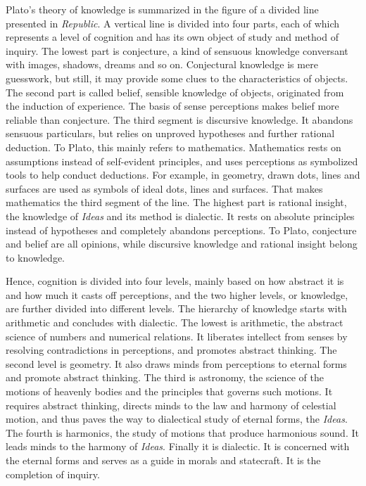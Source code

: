 \documentclass[11pt]{article}
\begin{document}
\begin{sloppypar}
Plato’s theory of knowledge is summarized in the figure of a divided line presented in \textit{Republic}. 
A vertical line is divided into four parts, each of which represents a level of cognition and has its own object of study and method of inquiry. 
The lowest part is conjecture, a kind of sensuous knowledge conversant with images, shadows, dreams and so on. 
Conjectural knowledge is mere guesswork, but still, it may provide some clues to the characteristics of objects. 
The second part is called belief, sensible knowledge of objects, originated from the induction of experience. 
The basis of sense perceptions makes belief more reliable than conjecture. 
The third segment is discursive knowledge. 
It abandons sensuous particulars, but relies on unproved hypotheses and further rational deduction. 
To Plato, this mainly refers to mathematics. 
Mathematics rests on assumptions instead of self-evident principles, and uses perceptions as symbolized tools to help conduct deductions. 
For example, in geometry, drawn dots, lines and surfaces are used as symbols of ideal dots, lines and surfaces. 
That makes mathematics the third segment of the line. 
The highest part is rational insight, the knowledge of \textit{Ideas} and its method is dialectic. 
It rests on absolute principles instead of hypotheses and completely abandons perceptions. 
To Plato, conjecture and belief are all opinions, while discursive knowledge and rational insight belong to knowledge.

\newline

Hence, cognition is divided into four levels, mainly based on how abstract it is and how much it casts off perceptions, and the two higher levels, or knowledge, are further divided into different levels. 
The hierarchy of knowledge starts with arithmetic and concludes with dialectic. 
The lowest is arithmetic, the abstract science of numbers and numerical relations. 
It liberates intellect from senses by resolving contradictions in perceptions, and promotes abstract thinking. 
The second level is geometry. 
It also draws minds from perceptions to eternal forms and promote abstract thinking. 
The third is astronomy, the science of the motions of heavenly bodies and the principles that governs such motions. 
It requires abstract thinking, directs minds to the law and harmony of celestial motion, and thus paves the way to dialectical study of eternal forms, the \textit{Ideas}. 
The fourth is harmonics, the study of motions that produce harmonious sound. 
It leads minds to the harmony of \textit{Ideas}. 
Finally it is dialectic. 
It is concerned with the eternal forms and serves as a guide in morals and statecraft. 
It is the completion of inquiry.


\end{sloppypar}
\end{document}
